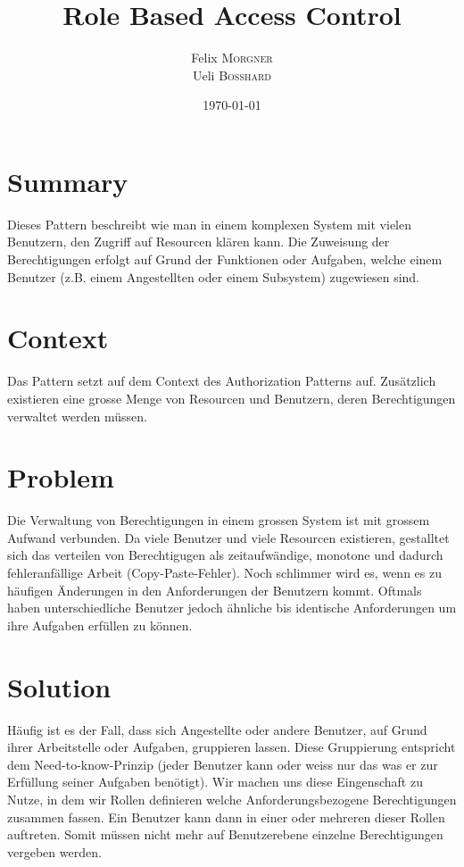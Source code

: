 \documentclass{article}
\title{Role Based Access Control} %
\author{Felix \textsc{Morgner}\\Ueli \textsc{Bosshard}} %
\date{\today} %
\begin{document}
\maketitle %

\section{Summary}
Dieses Pattern beschreibt wie man in einem komplexen System mit vielen Benutzern, den Zugriff auf Resourcen klären kann. Die Zuweisung der Berechtigungen erfolgt auf Grund der Funktionen oder Aufgaben, welche einem Benutzer (z.B. einem Angestellten oder einem Subsystem) zugewiesen sind.

\section{Context}
Das Pattern setzt auf dem Context des Authorization Patterns auf. Zusätzlich existieren eine grosse Menge von Resourcen und Benutzern, deren Berechtigungen verwaltet werden müssen.

\section{Problem}
Die Verwaltung von Berechtigungen in einem grossen System ist mit grossem Aufwand verbunden. Da viele Benutzer und viele Resourcen existieren, gestalltet sich das verteilen von Berechtigugen als zeitaufwändige, monotone und dadurch fehleranfällige Arbeit (Copy-Paste-Fehler). Noch schlimmer wird es, wenn es zu häufigen Änderungen in den Anforderungen der Benutzern kommt. Oftmals haben unterschiedliche Benutzer jedoch ähnliche bis identische Anforderungen um ihre Aufgaben erfüllen zu können.

\section{Solution}
Häufig ist es der Fall, dass sich Angestellte oder andere Benutzer, auf Grund ihrer Arbeitstelle oder Aufgaben, gruppieren lassen. Diese Gruppierung entspricht dem Need-to-know-Prinzip (jeder Benutzer kann oder weiss nur das was er zur Erfüllung seiner Aufgaben benötigt). Wir machen uns diese Eingenschaft zu Nutze, in dem wir Rollen definieren welche Anforderungsbezogene Berechtigungen zusammen fassen. Ein Benutzer kann dann in einer oder mehreren dieser Rollen auftreten. Somit müssen nicht mehr auf Benutzerebene einzelne Berechtigungen vergeben werden.
\end{document}
